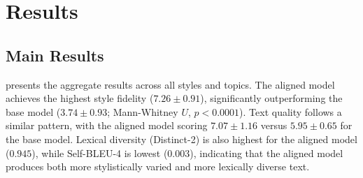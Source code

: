 \section{Results}
\label{sec:results}

\subsection{Main Results}
\label{sec:main_results}

 presents the aggregate results across all styles and topics.
The aligned model achieves the highest style fidelity ($7.26 \pm 0.91$),
significantly outperforming the base model ($3.74 \pm 0.93$; Mann-Whitney
$U$, $p < 0.0001$). Text quality follows a similar pattern, with the aligned
model scoring $7.07 \pm 1.16$ versus $5.95 \pm 0.65$ for the base model.
Lexical diversity (Distinct-2) is also highest for the aligned model ($0.945$),
while Self-BLEU-4 is lowest ($0.003$), indicating that the aligned model produces
both more stylistically varied and more lexically diverse text.

\begin{table}[t]
    \centering
    \renewcommand{\arraystretch}{1.25}
    \caption{Aggregate results across all 7 styles and 3 topics. Style fidelity and
    text quality are \gptjudge scores (1--10). Distinct-2 measures lexical diversity
    (higher is better). Self-BLEU-4 measures intra-condition similarity (lower is
    better). Best results in \textbf{bold}.}
    \label{tab:main}
\end{table}

